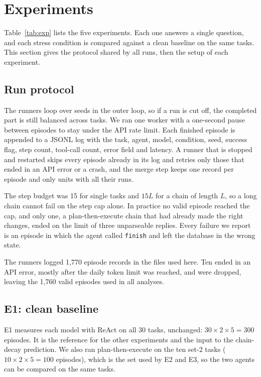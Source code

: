 \documentclass[10pt,a4paper,twocolumn]{article}
\begin{document}
\section{Experiments}
Table~\ref{tab:exp} lists the five experiments. Each one answers a single question, and each stress condition is
compared against a clean baseline on the same tasks. This section gives the protocol shared by all runs, then the setup
of each experiment.

\subsection{Run protocol}
The runners loop over seeds in the outer loop, so if a run is cut off, the completed part is still balanced across
tasks. We ran one worker with a one-second pause between episodes to stay under the API rate limit. Each finished
episode is appended to a JSONL log with the task, agent, model, condition, seed, success flag, step count, tool-call
count, error field and latency. A runner that is stopped and restarted skips every episode already in its log and
retries only those that ended in an API error or a crash, and the merge step keeps one record per episode and only units
with all their runs.

The step budget was 15 for single tasks and $15L$ for a chain of length $L$, so a long chain cannot fail on the step cap
alone. In practice no valid episode reached the cap, and only one, a plan-then-execute chain that had already made the
right changes, ended on the limit of three unparseable replies. Every failure we report is an episode in which the agent
called \texttt{finish} and left the database in the wrong state.

The runners logged 1,770 episode records in the files used here. Ten ended in an API error, mostly after the daily token
limit was reached, and were dropped, leaving the 1,760 valid episodes used in all analyses.

\subsection{E1: clean baseline}
E1 measures each model with ReAct on all 30 tasks, unchanged: $30\times2\times5=300$ episodes. It is the reference for
the other experiments and the input to the chain-decay prediction. We also ran plan-then-execute on the ten set-2 tasks
($10\times2\times5=100$ episodes), which is the set used by E2 and E3, so the two agents can be compared on the same
tasks.
\end{document}
